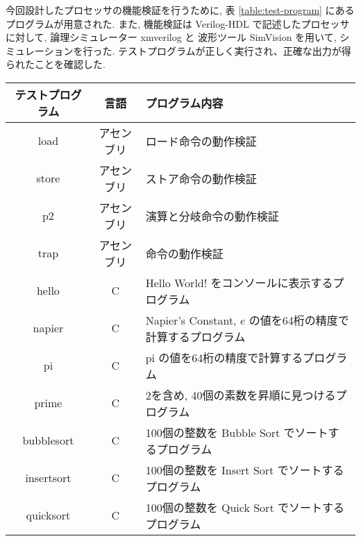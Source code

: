 \documentclass[../main.tex]{subfiles}
\begin{document}
  今回設計したプロセッサの機能検証を行うために, 
  表 \ref{table:test-program} にあるプログラムが用意された.
  また, 機能検証は Verilog-HDL で記述したプロセッサに対して, 
  論理シミュレーター xmverilog と
  波形ツール SimVision を用いて, シミュレーションを行った.
  テストプログラムが正しく実行され、正確な出力が得られたことを確認した.

  \begin{table*}[bp]
    \centering
    \begin{tabular}{|c|c|l|}
    \hline
    テストプログラム & 言語 & プログラム内容 \\ \hline
    load & アセンブリ & ロード命令の動作検証 \\
    store & アセンブリ & ストア命令の動作検証 \\
    p2 & アセンブリ & 演算と分岐命令の動作検証 \\
    trap & アセンブリ & 命令の動作検証 \\
    hello & C & Hello World! をコンソールに表示するプログラム \\
    napier & C & Napier's Constant, $e$ の値を64桁の精度で計算するプログラム \\
    pi & C & pi の値を64桁の精度で計算するプログラム \\
    prime & C & 2を含め, 40個の素数を昇順に見つけるプログラム \\
    bubblesort & C & 100個の整数を Bubble Sort でソートするプログラム \\
    insertsort & C & 100個の整数を Insert Sort でソートするプログラム \\
    quicksort & C & 100個の整数を Quick Sort でソートするプログラム \\ \hline
    \end{tabular}
    \caption{機能検証用テストプログラム}
    \label{table:test-program}
  \end{table*}
\end{document}

